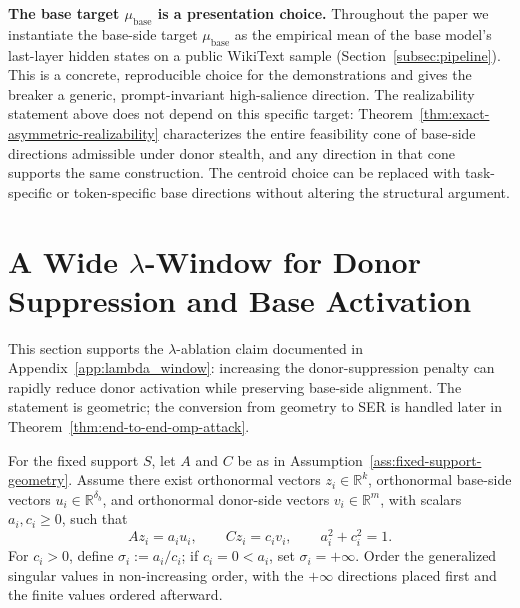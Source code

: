 \noindent\textbf{The base target $\mu_{\text{base}}$ is a presentation choice.}
Throughout the paper we instantiate the base-side target $\mu_{\text{base}}$ as the empirical mean of the base model's last-layer hidden states on a public WikiText sample (Section~\ref{subsec:pipeline}). This is a concrete, reproducible choice for the demonstrations and gives the breaker a generic, prompt-invariant high-salience direction. The realizability statement above does not depend on this specific target: Theorem~\ref{thm:exact-asymmetric-realizability} characterizes the entire feasibility cone of base-side directions admissible under donor stealth, and any direction in that cone supports the same construction. The centroid choice can be replaced with task-specific or token-specific base directions without altering the structural argument.

\section{A Wide $\lambda$-Window for Donor Suppression and Base Activation}
\label{app:lambda-window}

This section supports the $\lambda$-ablation claim documented in Appendix~\ref{app:lambda_window}: increasing the donor-suppression penalty can rapidly reduce donor activation while preserving base-side alignment. The statement is geometric; the conversion from geometry to SER is handled later in Theorem~\ref{thm:end-to-end-omp-attack}.

\begin{assumption}
\label{ass:orthogonal-gsvd}
For the fixed support $S$, let $A$ and $C$ be as in Assumption~\ref{ass:fixed-support-geometry}. Assume there exist orthonormal vectors $z_i\in\mathbb{R}^{k}$, orthonormal base-side vectors $u_i\in\mathbb{R}^{\delta_b}$, and orthonormal donor-side vectors $v_i\in\mathbb{R}^{m}$, with scalars $a_i,c_i\ge 0$, such that
\[
Az_i=a_i u_i,
\qquad
Cz_i=c_i v_i,
\qquad
a_i^2+c_i^2=1.
\]
For $c_i>0$, define $\sigma_i:=a_i/c_i$; if $c_i=0<a_i$, set $\sigma_i=+\infty$. Order the generalized singular values in non-increasing order, with the $+\infty$ directions placed first and the finite values ordered afterward.
\end{assumption}

